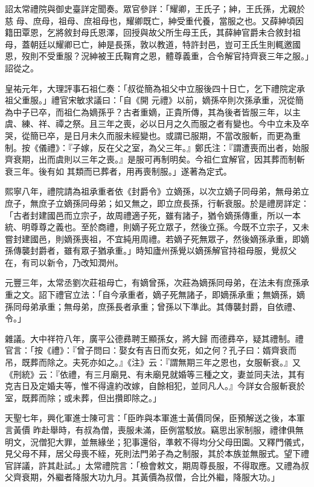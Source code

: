 \begin{pinyinscope}
 詔太常禮院與御史臺詳定聞奏。眾官參詳：「耀卿，王氏子；紳，王氏孫，尤親於慈
 母、庶母，祖母、庶祖母也，耀卿既亡，紳受重代養，當服之也。又薛紳頃因籍田覃恩，乞將敘封母氏恩澤，回授與故父所生母王氏，其薛紳官爵未合敘封祖母，蓋朝廷以耀卿已亡，紳是長孫，敦以教道，特許封邑，豈可王氏生則輒邀國恩，歿則不受重服？況紳被王氏鞠育之恩，體尊義重，合令解官持齊衰三年之服。」詔從之。



 皇祐元年，大理評事石祖仁奏：「叔從簡為祖父中立服後四十日亡，乞下禮院定承祖父重服。」禮官宋敏求議曰：「自《開
 元禮》以前，嫡孫卒則次孫承重，況從簡為中子已卒，而祖仁為嫡孫乎？古者重嫡，正貴所傳，其為後者皆服三年，以主虞、練、祥、禫之祭。且三年之喪，必以日月之久而服之者有變也。今中立未及卒哭，從簡已卒，是日月未久而服未經變也。或謂已服期，不當改服斬，而更為重制。按《儀禮》：『子嫁，反在父之室，為父三年。』鄭氏注：『謂遭喪而出者，始服齊衰期，出而虞則以三年之喪。』是服可再制明矣。今祖仁宜解官，因其葬而制斬衰三年。後有如
 其類而已葬者，用再喪制服。」遂著為定式。



 熙寧八年，禮院請為祖承重者依《封爵令》立嫡孫，以次立嫡子同母弟，無母弟立庶子，無庶子立嫡孫同母弟；如又無之，即立庶長孫，行斬衰服。於是禮房詳定：「古者封建國邑而立宗子，故周禮適子死，雖有諸子，猶令嫡孫傳重，所以一本統、明尊尊之義也。至於商禮，則嫡子死立眾子，然後立孫。今既不立宗子，又未嘗封建國邑，則嫡孫喪祖，不宜純用周禮。若嫡子死無眾子，然後嫡孫承重，即嫡
 孫傳襲封爵者，雖有眾子猶承重。」時知廬州孫覺以嫡孫解官持祖母服，覺叔父在，有司以新令，乃改知潤州。



 元豐三年，太常丞劉次莊祖母亡，有嫡曾孫，次莊為嫡孫同母弟，在法未有庶孫承重之文。詔下禮官立法：「自今承重者，嫡子死無諸子，即嫡孫承重；無嫡孫，嫡孫同母弟承重；無母弟，庶孫長者承重；曾孫以下準此。其傳襲封爵，自依禮、令。」



 雜議。大中祥符八年，廣平公德彞聘王顯孫女，將大歸
 而德彞卒，疑其禮制。禮官言：「按《禮》：『曾子問曰：娶女有吉日而女死，如之何？孔子曰：婿齊衰而吊，既葬而除之。夫死亦如之。』《注》云：『謂無期三年之恩也，女服斬衰。』又《刑統》云：『依禮，有三月廟見、有未廟見就婚等三種之文，妻並同夫法，其有克吉日及定婚夫等，惟不得違約改嫁，自餘相犯，並同凡人。』今詳女合服斬衰於室，既葬而除；或未葬，但出攢即除之。」



 天聖七年，興化軍進士陳可言：「臣昨與本軍進士黃價同保，臣預解送之後，本軍言黃價
 昨赴舉時，有叔為僧，喪服未滿，臣例當駁放。竊思出家制服，禮律俱無明文，況僧犯大罪，並無緣坐；犯事還俗，準敕不得均分父母田園。又釋門儀式，見父母不拜，居父母喪不絰，死則法門弟子為之制服，其於本族並無服式。望下禮官詳議，許其赴試。」太常禮院言：「檢會敕文，期周尊長服，不得取應。又禮為叔父齊衰期，外繼者降服大功九月。其黃價為叔僧，合比外繼，降服大功。」




\end{pinyinscope}
